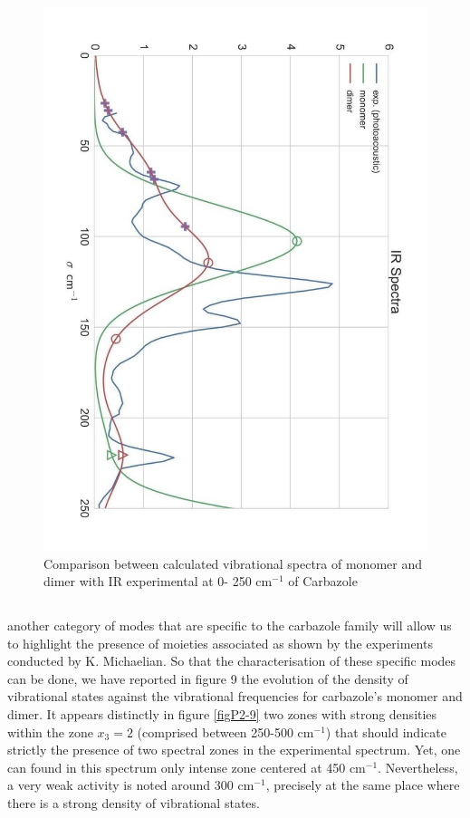 	 		\begin{figure}[H]
	 			\begin{center}
	 				\includegraphics[angle=90,scale=0.32]{image/8}
	 			\end{center}
	 			\caption{Comparison between calculated vibrational spectra of monomer and dimer with IR experimental at 0- 250 cm$^{-1}$ of Carbazole} \label{figP2-8}
	 		\end{figure}
	 		
	 		
	 \subsection{}
	
	another category of modes that are specific to the carbazole family will allow us to highlight the presence of moieties associated as shown by the experiments conducted by K. Michaelian. So that the characterisation of these specific modes can be done, we have reported in figure 9 the evolution of the density of vibrational states against the vibrational frequencies for carbazole’s monomer and dimer. It appears distinctly in figure \ref{figP2-9} two zones with strong densities within the zone $x_3=2$ (comprised between 250-500 cm$^{-1}$) that should indicate strictly the presence of two spectral zones in the experimental spectrum. Yet, one can found in this spectrum only intense zone centered at 450 cm$^{-1}$. Nevertheless, a very weak activity is noted around 300 cm$^{-1}$, precisely at the same place where there is a strong density of vibrational states. 
	
